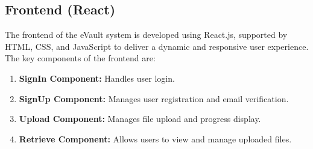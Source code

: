 \documentclass[12pt,a4paper]{report}
\begin{document}

    


\subsection{Frontend (React)}
\par
The frontend of the eVault system is developed using React.js, supported by HTML, CSS, and JavaScript to deliver a dynamic and responsive user experience. The key components of the frontend are:
\begin{enumerate}
   \item \textbf{SignIn Component:} Handles user login.
   \item \textbf{SignUp Component:} Manages user registration and email verification.
   \item \textbf{Upload Component:} Manages file upload and progress display.
   \item \textbf{Retrieve Component:} Allows users to view and manage uploaded files.
\end{enumerate}
   
   
   
\end{document}

